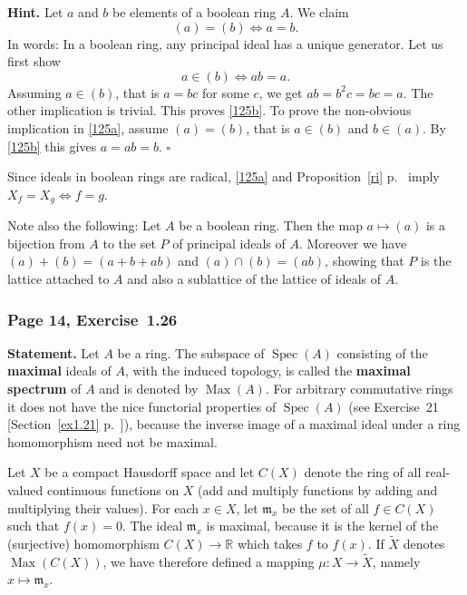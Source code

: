 \documentclass[12pt,letterpaper]{article}%
\newcommand{\oo}{\operatorname}\newcommand{\ooo}{\operatorname*}
\newcommand{\mf}{\mathfrak}
\newcommand{\mmm}{\mf m}
\newcommand{\Spec}{\operatorname{Spec}}\newcommand{\Sp}{\operatorname{Spec}}
\newcommand{\nn}{\noindent}
\begin{document}
\nn\textbf{Hint.} Let $a$ and $b$ be elements of a boolean ring $A$. We claim
\begin{equation}\label{125a}
(a)=(b)\iff a=b.
\end{equation} 
In words: In a boolean ring, any principal ideal has a unique generator. Let us first show 
\begin{equation}\label{125b}
a\in(b)\iff ab=a.
\end{equation}
Assuming $a\in(b)$, that is $a=bc$ for some $c$, we get $ab=b^2c=bc=a$. The other implication is trivial. This proves \eqref{125b}. To prove the non-obvious implication in \eqref{125a}, assume $(a)=(b)$, that is $a\in(b)$ and $b\in(a)$. By \eqref{125b} this gives $a=ab=b$. $\square$

Since ideals in boolean rings are radical, \eqref{125a} and Proposition~\ref{ri} p.~\pageref{ri} imply $X_f=X_g\iff f=g$.

Note also the following: Let $A$ be a boolean ring. Then the map $a\mapsto(a)$ is a bijection from $A$ to the set $P$ of principal ideals of $A$. Moreover we have $(a)+(b)=(a+b+ab)$ and $(a)\cap(b)=(ab)$, showing that $P$ is the lattice attached to $A$ and also a sublattice of the lattice of ideals of $A$.

\subsubsection{Page 14, Exercise~1.26}%

\textbf{Statement.} Let $A$ be a ring. The subspace of $\Spec(A)$ consisting of the \textbf{maximal} ideals of $A$, with the induced topology, is called the \textbf{maximal spectrum} of $A$ and is denoted by $\oo{Max}(A)$. For arbitrary commutative rings it does not have the nice functorial properties of $\Spec(A)$ (see Exercise~21 [Section~\ref{ex1.21} p.~\pageref{ex1.21}]), because the inverse image of a maximal ideal under a ring homomorphism need not be maximal.

Let $X$ be a compact Hausdorff space and let $C(X)$ denote the ring of all real-valued continuous functions on $X$ (add and multiply functions by adding and multiplying their values). For each $x\in X$, let $\mmm_x$ be the set of all $f\in C(X)$ such that $f(x)=0$. The ideal $\mmm_x$ is maximal, because it is the kernel of the (surjective) homomorphism $C(X)\to\mathbb R$ which takes $f$ to $f(x)$. If $\widetilde X$ denotes $\oo{Max}(C(X))$, we have therefore defined a mapping $\mu:X\to\widetilde X$, namely $x\mapsto\mmm_x$.
\end{document}
